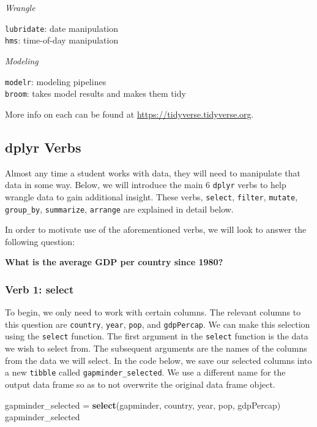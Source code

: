 \documentclass[]{book}
\newenvironment{Shaded}{\begin{snugshade}}{\end{snugshade}}
\newcommand{\KeywordTok}[1]{\textcolor[rgb]{0.13,0.29,0.53}{\textbf{#1}}}
\newcommand{\NormalTok}[1]{#1}
\newcommand{\StringTok}[1]{\textcolor[rgb]{0.31,0.60,0.02}{#1}}
\begin{document}
\emph{Wrangle}

\texttt{lubridate}: date manipulation\\
\texttt{hms}: time-of-day manipulation

\emph{Modeling}

\texttt{modelr}: modeling pipelines\\
\texttt{broom}: takes model results and makes them tidy

More info on each can be found at \url{https://tidyverse.tidyverse.org}.

\hypertarget{dplyr-verbs}{%
\subsection{dplyr Verbs}\label{dplyr-verbs}}

Almost any time a student works with data, they will need to manipulate that data in some way. Below, we will introduce the main 6 \texttt{dplyr} verbs to help wrangle data to gain additional insight. These verbs, \texttt{select}, \texttt{filter}, \texttt{mutate}, \texttt{group\_by}, \texttt{summarize}, \texttt{arrange} are explained in detail below.

In order to motivate use of the aforementioned verbs, we will look to answer the following question:

\textbf{What is the average GDP per country since 1980?}

\hypertarget{verb-1-select}{%
\subsubsection{Verb 1: select}\label{verb-1-select}}

To begin, we only need to work with certain columns. The relevant columns to this question are \texttt{country}, \texttt{year}, \texttt{pop}, and \texttt{gdpPercap}. We can make this selection using the \texttt{select} function. The first argument in the \texttt{select} function is the data we wish to select from. The subsequent arguments are the names of the columns from the data we will select. In the code below, we save our selected columns into a new \texttt{tibble} called \texttt{gapminder\_selected}. We use a different name for the output data frame so as to not overwrite the original data frame object.

\begin{Shaded}
\begin{Highlighting}[]
\NormalTok{gapminder_selected =}\StringTok{ }\KeywordTok{select}\NormalTok{(gapminder, country, year, pop, gdpPercap)}
\NormalTok{gapminder_selected }
\end{Highlighting}
\end{Shaded}
\end{document}
